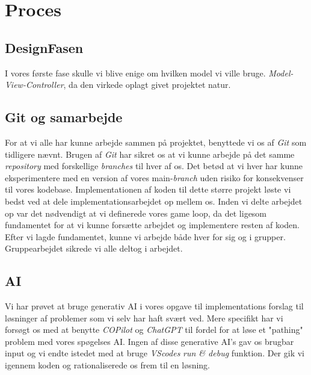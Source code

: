 \documentclass{article}
\theoremstyle{mytheoremstyle}
\theoremstyle{mytheoremstyle}
\theoremstyle{myproblemstyle}
\begin{document}
\section{Proces}\label{sec:Proces} %
\subsection{DesignFasen}
I vores første fase skulle vi blive enige om hvilken model vi ville bruge. 
\textit{Model-View-Controller}, da den virkede oplagt givet projektet natur.

\subsection{Git og samarbejde}
For at vi alle har kunne arbejde sammen på projektet, benyttede vi os af
\textit{Git} som tidligere nævnt. Brugen af \textit{Git} har sikret os at vi
kunne arbejde på det samme \textit{repository} med forskellige \textit{branches}
til hver af os. Det betød at vi hver har kunne eksperimentere med en version af
vores main-\textit{branch} uden risiko for konsekvenser til vores kodebase.
Implementationen af koden til dette større projekt løste vi bedst ved at dele
implementationsarbejdet op mellem os. Inden vi delte arbejdet op var det
nødvendigt at vi definerede vores game loop, da det ligesom fundamentet for at
vi kunne forsætte arbejdet og implementere resten af koden. Efter vi lagde
fundamentet, kunne vi arbejde både hver for sig og i grupper. Gruppearbejdet
sikrede vi alle deltog i arbejdet.

\subsection{AI}
Vi har prøvet at bruge generativ AI i vores opgave til implementations forslag
til løsninger af problemer som vi selv har haft svært ved. Mere specifikt har vi
forsøgt os med at benytte \textit{COPilot} og \textit{ChatGPT} til fordel for at
løse et "pathing" problem med vores spøgelses AI. Ingen af disse generative AI's
gav os brugbar input og vi endte istedet med at bruge \textit{VScodes}
\textit{run \& debug} funktion. Der gik vi igennem koden og rationaliserede os
frem til en løsning.

\end{document}
